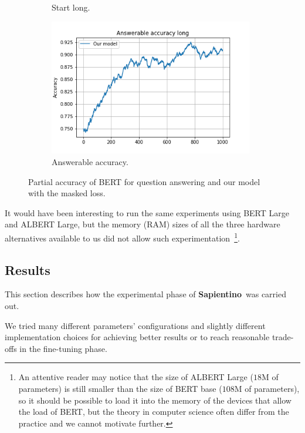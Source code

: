 \documentclass[10pt,hidelinks]{article}
\newcommand\nomefico{\textbf{Sapientino}}
\begin{document}
\begin{figure}[ht]
\begin{subfigure}[t]{.50\textwidth}
		\caption{Start long.}\label{fig:loss3_2}
	\end{subfigure}\hfill
	\begin{subfigure}[t]{.50\textwidth}
		\centering
		\includegraphics[width=0.98\textwidth]{report/pics/full_answerable.png}
		\caption{Answerable accuracy.}\label{fig:answerable}
	\end{subfigure}
	
	\caption{Partial accuracy of BERT for question answering and our model with the masked loss.}
	\label{fig:two_models}
\end{figure}


It would have been interesting to run the same experiments using BERT Large and ALBERT Large, but the memory (RAM) sizes of all the three hardware alternatives available to us did not allow such experimentation~\footnote{An attentive reader may notice that the size of ALBERT Large ($18$M of parameters) is still smaller than the size of BERT base ($108$M of parameters), so it should be possible to load it into the memory of the devices that allow the load of BERT, but the theory in computer science often differ from the practice and we cannot motivate further.}.

\subsection{Results}\label{sec:experimental_results}

This section describes how the experimental phase of \nomefico~was carried out.

\noindent We tried many different parameters' configurations and slightly different implementation choices for achieving better results or to reach reasonable trade-offs in the fine-tuning phase.
\end{document}

